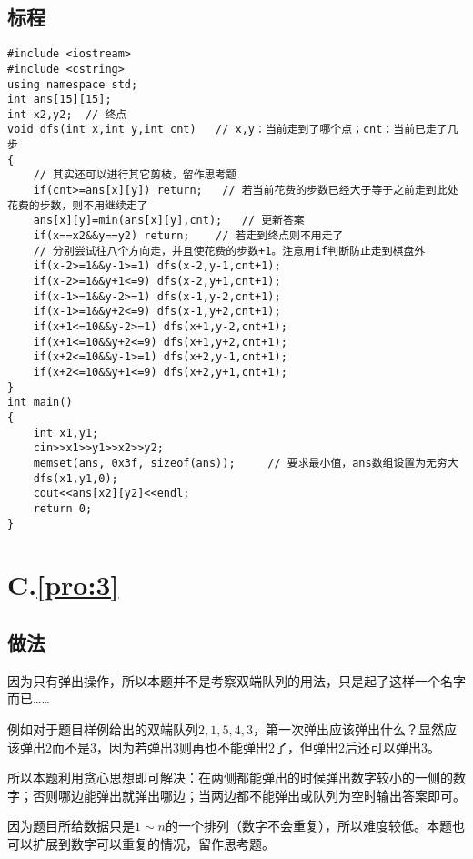 \documentclass[
	lang=cn,
	color=blue
]{elegantbook}
\begin{document}
\section*{标程}
\begin{lstlisting}
#include <iostream>
#include <cstring>
using namespace std;
int ans[15][15];
int x2,y2;  // 终点
void dfs(int x,int y,int cnt)   // x,y：当前走到了哪个点；cnt：当前已走了几步
{
    // 其实还可以进行其它剪枝，留作思考题
    if(cnt>=ans[x][y]) return;   // 若当前花费的步数已经大于等于之前走到此处花费的步数，则不用继续走了
    ans[x][y]=min(ans[x][y],cnt);   // 更新答案
    if(x==x2&&y==y2) return;    // 若走到终点则不用走了
    // 分别尝试往八个方向走，并且使花费的步数+1。注意用if判断防止走到棋盘外
    if(x-2>=1&&y-1>=1) dfs(x-2,y-1,cnt+1);
    if(x-2>=1&&y+1<=9) dfs(x-2,y+1,cnt+1);
    if(x-1>=1&&y-2>=1) dfs(x-1,y-2,cnt+1);
    if(x-1>=1&&y+2<=9) dfs(x-1,y+2,cnt+1);
    if(x+1<=10&&y-2>=1) dfs(x+1,y-2,cnt+1);
    if(x+1<=10&&y+2<=9) dfs(x+1,y+2,cnt+1);
    if(x+2<=10&&y-1>=1) dfs(x+2,y-1,cnt+1);
    if(x+2<=10&&y+1<=9) dfs(x+2,y+1,cnt+1);
}
int main()
{
    int x1,y1;
    cin>>x1>>y1>>x2>>y2;
    memset(ans, 0x3f, sizeof(ans));     // 要求最小值，ans数组设置为无穷大
    dfs(x1,y1,0);
    cout<<ans[x2][y2]<<endl;
    return 0;
}
\end{lstlisting}

\chapter*{C.\quad \ref*{pro:3}}
\section*{做法}
因为只有弹出操作，所以本题并不是考察双端队列的用法，只是起了这样一个名字而已……

例如对于题目样例给出的双端队列$2,1,5,4,3$，第一次弹出应该弹出什么？显然应该弹出$2$而不是$3$，因为若弹出3则再也不能弹出$2$了，但弹出$2$后还可以弹出$3$。

所以本题利用贪心思想即可解决：在两侧都能弹出的时候弹出数字较小的一侧的数字；否则哪边能弹出就弹出哪边；当两边都不能弹出或队列为空时输出答案即可。

因为题目所给数据只是$1 \sim n$的一个排列（数字不会重复），所以难度较低。本题也可以扩展到数字可以重复的情况，留作思考题。
\end{document}
